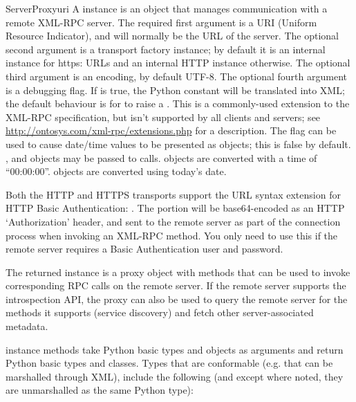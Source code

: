 \begin{classdesc}{ServerProxy}{uri}
A  instance is an object that manages communication
with a remote XML-RPC server.  The required first argument is a URI
(Uniform Resource Indicator), and will normally be the URL of the
server.  The optional second argument is a transport factory instance;
by default it is an internal  instance for https:
URLs and an internal HTTP  instance otherwise.  The
optional third argument is an encoding, by default UTF-8. The optional
fourth argument is a debugging flag.  If  is true, 
the Python constant  will be translated into XML; the
default behaviour is for  to raise a .
This is a commonly-used extension to the XML-RPC specification, but isn't
supported by all clients and servers; see
\url{http://ontosys.com/xml-rpc/extensions.php} for a description. 
The  flag can be used to cause date/time values to be
presented as  objects; this is false
by default.  ,
 and 
objects may be passed to calls.   objects
are converted with a time of ``00:00:00''.
 objects are converted using today's date.

Both the HTTP and HTTPS transports support the URL syntax extension for
HTTP Basic Authentication: .  The 
 portion will be base64-encoded as an HTTP `Authorization'
header, and sent to the remote server as part of the connection process
when invoking an XML-RPC method.  You only need to use this if the
remote server requires a Basic Authentication user and password.

The returned instance is a proxy object with methods that can be used
to invoke corresponding RPC calls on the remote server.  If the remote
server supports the introspection API, the proxy can also be used to query
the remote server for the methods it supports (service discovery) and
fetch other server-associated metadata.

 instance methods take Python basic types and objects as 
arguments and return Python basic types and classes.  Types that are
conformable (e.g. that can be marshalled through XML), include the
following (and except where noted, they are unmarshalled as the same
Python type):


\end{classdesc}
